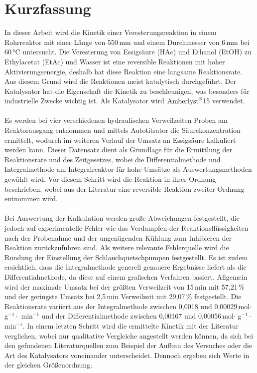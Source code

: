 \documentclass[12pt,liststotoc]{report}
\begin{document}

\chapter*{Kurzfassung}


In dieser Arbeit wird die Kinetik einer Veresterungsreaktion in einem Rohrreaktor mit einer Länge von 550\,mm und einem Durchmesser von 6\,mm bei 60\,°C untersucht. Die Veresterung von Essigsäure (HAc) und Ethanol (EtOH) zu Ethylacetat (EtAc) und Wasser ist eine reversible Reaktionen mit hoher Aktivierungsenergie, deshalb hat diese Reaktion eine langsame Reaktionsrate. Aus diesem Grund wird die Reaktionen meist katalytisch durchgeführt. Der Katalysator hat die Eigenschaft die Kinetik zu beschleunigen, was besonders für industrielle Zwecke wichtig ist. Als Katalysator wird  $\text{Amberlyst}^\text{\textregistered}$15 verwendet.
\\
\\
Es werden bei vier verschiedenen hydraulischen Verweilzeiten Proben am Reaktorausgang entnommen und mittels Autotitrator die Säurekonzentration ermittelt, wodurch im weiteren Verlauf der Umsatz an Essigsäure kalkuliert werden kann. Dieser Datensatz dient als Grundlage für die Ermittlung der Reaktionsrate und des Zeitgesetzes, wobei die Differentialmethode und Integralmethode am Integralreaktor für hohe Umsätze als Auswertungsmethoden gewählt wird. Vor diesem Schritt wird die Reaktion in ihrer Ordnung beschrieben, wobei aus der Literatur eine reversible Reaktion zweiter Ordnung entnommen wird. 
\\
\\
Bei Auswertung der Kalkulation werden große Abweichungen festgestellt, die jedoch auf experimentelle Fehler wie das Verdampfen der Reaktionsflüssigkeiten nach der Probenahme und der ungenügenden Kühlung zum Inhibieren der Reaktion zurückzuführen sind. Als weitere relevante Fehlerquelle wird die Rundung der Einstellung der Schlauchquetschpumpen festgestellt. Es ist zudem ersichtlich, dass die Integralmethode generell genauere Ergebnisse liefert als die Differentialmethode, da diese auf einem grafischen Verfahren basiert. Allgemein wird der maximale Umsatz bei der größten Verweilzeit von 15\,min mit 57,21\,\%  und der geringste Umsatz bei 2,5\,min Verweilzeit mit 29,07\,\% festgestellt. Die Reaktionsrate variiert aus der Integralmethode zwischen 0,0018 und 0,00029\,mol$\cdot$ g$^{-1} \cdot$ min$^{-1}$ und der Differentialmethode zwischen 0,00167 und 0,00056\,mol$\cdot$ g$^{-1} \cdot$ min$^{-1}$. In einem letzten Schritt wird die ermittelte Kinetik mit der Literatur verglichen, wobei nur qualitative Vergleiche angestellt werden können, da sich bei den gefundenen Literaturquellen zum Beispiel der Aufbau des Versuches oder die Art des Katalysators voneinander unterscheidet. Dennoch ergeben sich Werte in der gleichen Größenordnung. 
\end{document}
